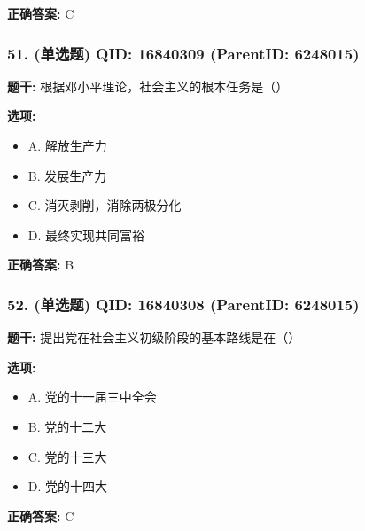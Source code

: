 \documentclass[12pt,UTF8]{ctexart}
\begin{document}
\textbf{正确答案:}
C

\vspace{0.3em}\hrulefill\vspace{0.7em}

\subsubsection*{51. (单选题) \small QID: 16840309 (ParentID: 6248015)}

\textbf{题干:}
根据邓小平理论，社会主义的根本任务是（）



\textbf{选项:}
\begin{itemize}[leftmargin=*]

  \item A. 解放生产力

  \item B. 发展生产力

  \item C. 消灭剥削，消除两极分化

  \item D. 最终实现共同富裕

\end{itemize}

\textbf{正确答案:}
B

\vspace{0.3em}\hrulefill\vspace{0.7em}

\subsubsection*{52. (单选题) \small QID: 16840308 (ParentID: 6248015)}

\textbf{题干:}
提出党在社会主义初级阶段的基本路线是在（）



\textbf{选项:}
\begin{itemize}[leftmargin=*]

  \item A. 党的十一届三中全会

  \item B. 党的十二大

  \item C. 党的十三大

  \item D. 党的十四大

\end{itemize}

\textbf{正确答案:}
C
\end{document}
